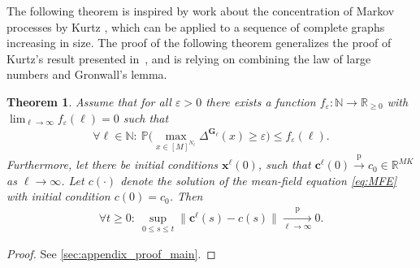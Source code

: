 \documentclass[a4paper,
               10pt,
               pdftex,
               normalheadings,
               headsepline,
               footsepline,
               headinclude,
               footinclude,
               DIV=14,
               abstracton]
{scrartcl}
\newtheorem{theorem}{Theorem}[section]
\newcommand{\R}{\mathbb{R}}
\newcommand{\rv}[1]{\bm{#1}}
\newcommand{\toprob}{\overset{\mathrm{p}}{\longrightarrow}}
\begin{document}
The following theorem is inspired by work about the concentration of Markov processes by Kurtz \cite{Kurtz1978}, which can be applied to a sequence of complete graphs increasing in size. The proof of the following theorem generalizes the proof of Kurtz's result presented in~\cite[Thm. A.14]{Winkelmann2020}, and is relying on combining the law of large numbers and Gronwall's lemma.
\begin{theorem} \label{thm:main}
Assume that for all $\varepsilon > 0$ there exists a function $f_\varepsilon:\mathbb{N}\to \R_{\geq 0}$ with $\lim_{\ell \to \infty} f_\varepsilon(\ell) = 0$ such that
\begin{align}
    \forall \ell \in \mathbb{N}:\ \mathbb{P}\Big(\max_{x\in [M]^{N_\ell}} \Delta^{\rv{G}_\ell}(x) \geq \varepsilon \Big) \leq f_\varepsilon(\ell).
\end{align}
Furthermore, let there be initial conditions $\rv{x}^\ell(0)$, such that $\rv{c}^\ell(0) \toprob c_0 \in \R^{MK}$ as $\ell \to \infty$.
Let $c(\cdot)$ denote the solution of the mean-field equation \eqref{eq:MFE} with initial condition $c(0) = c_0$.
Then 
\begin{align}
    \forall t \geq 0:\ \sup_{0 \leq s \leq t} \big\lVert \rv{c}^\ell(s) - c(s) \big\rVert \underset{\ell \to \infty}{\toprob} 0.
\end{align}
\end{theorem}

\begin{proof}
See \cref{sec:appendix_proof_main}.
\end{proof}
\end{document}
